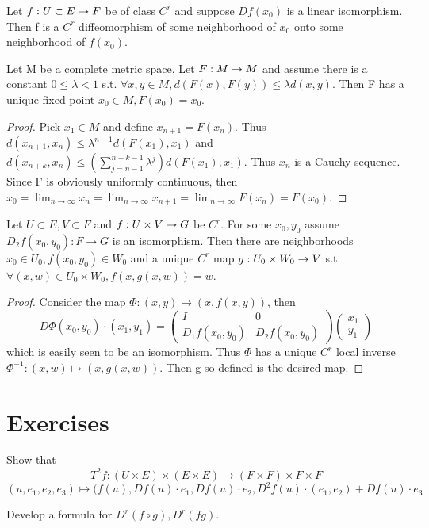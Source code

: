 \begin{thm}
Let ${f}:{U\subset E}\rightarrow{F}$ be of class $C^r$ and suppose $Df(x_0)$ is a linear isomorphism. Then f is a $C^r$ diffeomorphism 
of some neighborhood of $x_0$ onto some neighborhood of $f(x_0)$. 
\end{thm}
\begin{lem}
Let M be a complete metric space, Let ${F}:{M}\rightarrow{M}$ and assume there is a constant $0\leq\lambda<1$ s.t. $\forall x,y\in M,
d(F(x),F(y))\leq \lambda d(x,y)$. Then F has a unique fixed point $x_0\in M, F(x_0)=x_0$.
\end{lem}
\begin{proof}
Pick $x_1\in M$ and define $x_{n+1}=F(x_n)$. Thus $d(x_{n+1},x_n)\leq \lambda^{n-1}d(F(x_1),x_1)$ and $d(x_{n+k},x_n)\leq 
\left(\sum_{j=n-1}^{n+k-1}\lambda^{j}\right)d(F(x_1),x_1)$. Thus $x_n$ is a Cauchy sequence. Since F is obviously uniformly
continuous, then $x_0=\lim_{n\rightarrow \infty}x_n=\lim_{n\rightarrow \infty}x_{n+1}=\lim_{n\rightarrow \infty}F(x_n)=F(x_0)$.
\end{proof}
\begin{thm}
Let $U\subset E, V\subset F$ and ${f}:{U\times V}\rightarrow{G}$ be $C^r$. For some $x_0,y_0$ assume $D_2f(x_0,y_0):F\rightarrow G$ 
is an isomorphism. Then there are neighborhoods $x_0\in U_0, f(x_0,y_0)\in W_0$ and a unique $C^r$ map ${g}:{U_0\times W_0}\rightarrow{V}$
s.t. $\forall (x,w)\in U_0\times W_0, f(x,g(x,w))=w$.
\end{thm}
\begin{proof}
Consider the map $\Phi:(x,y)\mapsto (x,f(x,y))$, then $$D\Phi(x_0,y_0)\cdot(x_1,y_1)=
\left(\begin{matrix}
I & 0 \\
D_1f(x_0,y_0) & D_2f(x_0,y_0)
\end{matrix}\right)
\left(\begin{matrix}
x_1 \\
y_1
\end{matrix}\right)$$
which is easily seen to be an isomorphism. Thus $\Phi$ has a unique $C^r$ local inverse $\Phi^{-1}:(x,w)\mapsto (x,g(x,w))$.
Then g so defined is the desired map.
\end{proof}
\section*{Exercises}
\begin{exer}
Show that $$T^2f:(U\times E)\times(E\times E)\rightarrow (F\times F)\times F\times F $$ $$ (u,e_1,e_2,e_3)\mapsto 
(f(u),Df(u)\cdot e_1, Df(u)\cdot e_2, D^2f(u)\cdot(e_1,e_2)+Df(u)\cdot e_3$$
\end{exer}
\begin{exer}
Develop a formula for $D^r(f\circ g), D^r(fg)$.
\end{exer}
